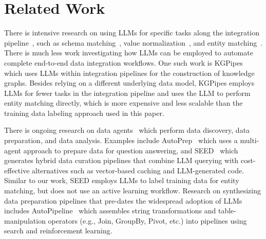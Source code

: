 \section{Related Work}
\label{sec:related_work}

There is intensive research on using LLMs for specific tasks along the integration pipeline~\cite{freire2025llmDataDiscoveryIntegration}, such as schema matching~\cite{narayan2022can, zhang2023schema,liu2025magneto}, value normalization~\cite{brinkmann2024productAttrNormLLMs}, and entity matching~\cite{peeters2024entity,wang2025matchcompare}. There is much less work investigating how LLMs can be employed to automate complete end-to-end data integration workflows. One such work is KGPipes~\cite{hofer2025kgpipes} which uses LLMs within integration pipelines for the construction of knowledge graphs. Besides relying on a different underlying data model, KGPipes employs LLMs for fewer tasks in the integration pipeline and uses the LLM to perform entity matching directly, which is more expensive and less scalable than the training data labeling approach used in this paper.

There is ongoing research on data agents~\cite{zhu2025surveydataagents} which perform data discovery, data preparation, and data analysis. Examples include AutoPrep~\cite{fanAutoPrep2025} which uses a multi-agent approach to prepare data for question answering, and SEED~\cite{maddenCafarellaSEED2023} which generates hybrid data curation pipelines that combine LLM querying with cost-effective alternatives such as vector-based caching and LLM-generated code. Similar to our work, SEED employs LLMs to label training data for entity matching, but does not use an active learning workflow.
Research on synthesizing data preparation pipelines that pre-dates the widespread adoption of LLMs includes AutoPipeline~\cite{AutoPipelineVLDB2021} which assembles string transformations and table-manipulation operators (e.g., Join, GroupBy, Pivot, etc.) into pipelines using search and reinforcement learning.


